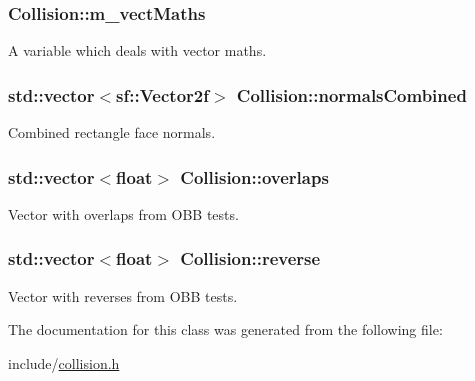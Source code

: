 \subsubsection[{\texorpdfstring{m\+\_\+vect\+Maths}{m_vectMaths}}]{ Collision\+::m\+\_\+vect\+Maths\hspace{0.3cm}{\ttfamily [private]}}\hypertarget{class_collision_affb289a519ea7c61695ab74e11a82b5d}{}\label{class_collision_affb289a519ea7c61695ab74e11a82b5d}
A variable which deals with vector maths. 
\subsubsection[{\texorpdfstring{normals\+Combined}{normalsCombined}}]{\setlength{\rightskip}{0pt plus 5cm}std\+::vector$<$sf\+::\+Vector2f$>$ Collision\+::normals\+Combined\hspace{0.3cm}{\ttfamily [private]}}\hypertarget{class_collision_aa3e126df67a5d939cfc0ec2ebac14cf5}{}\label{class_collision_aa3e126df67a5d939cfc0ec2ebac14cf5}
Combined rectangle face normals. 
\subsubsection[{\texorpdfstring{overlaps}{overlaps}}]{\setlength{\rightskip}{0pt plus 5cm}std\+::vector$<$float$>$ Collision\+::overlaps\hspace{0.3cm}{\ttfamily [private]}}\hypertarget{class_collision_a789d44569f105338d670feabc02bc2ce}{}\label{class_collision_a789d44569f105338d670feabc02bc2ce}
Vector with overlaps from O\+BB tests. 
\subsubsection[{\texorpdfstring{reverse}{reverse}}]{\setlength{\rightskip}{0pt plus 5cm}std\+::vector$<$float$>$ Collision\+::reverse\hspace{0.3cm}{\ttfamily [private]}}\hypertarget{class_collision_ad92247b56bd8dc65526bf9e740baa9d0}{}\label{class_collision_ad92247b56bd8dc65526bf9e740baa9d0}
Vector with reverses from O\+BB tests. 

The documentation for this class was generated from the following file\+:\begin{DoxyCompactItemize}
\item 
include/\hyperlink{collision_8h}{collision.\+h}\end{DoxyCompactItemize}
